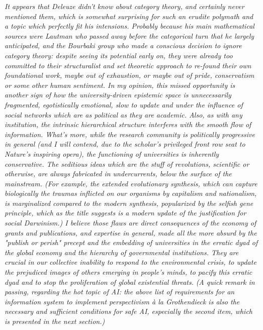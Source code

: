 \documentclass[11pt]{article}
\begin{document}
\emph{It appears that Deleuze didn't know about category theory, and certainly never
mentioned them, which is somewhat surprising for such an erudite polymath and a topic
which perfectly fit his intensions. Probably because his main mathematical sources were
Lautman who passed away before the categorical turn that he largely anticipated, and the
Bourbaki group who made a conscious decision to ignore category theory: despite seeing
its potential early on, they were already too committed to their structuralist and set
theoretic approach to re-found their own foundational work, maybe out of exhaustion, or
maybe out of pride, conservatism or some other human sentiment. In my opinion, this
missed opportunity is another sign of how the university-driven epistemic space is
unnecessarily fragmented, egotistically emotional, slow to update and under the
influence of social networks which are as political as they are academic. Also, as with
any institution, the intrinsic hierarchical structure interferes with the smooth flow of
information. What's more, while the research community is politically progressive in
general (and I will contend, due to the scholar's privileged front row seat to Nature's
inspiring opera), the functioning of universities is inherently conservative. The
seditious ideas which are the stuff of revolutions, scientific or otherwise, are always
fabricated in undercurrents, below the surface of the mainstream. (For example, the
extended evolutionary synthesis, which can capture biologically the traumas inflicted on
our organisms by capitalism and nationalism, is marginalized compared to the modern
synthesis, popularized by the selfish gene principle, which as the title suggests is a
modern update of the justification for social Darwinism.) I believe those flaws are
direct consequences of the economy of grants and publications, and expertise in general,
made all the more absurd by the "publish or perish" precept and the embedding of
universities in the erratic dyad of the global economy and the hierarchy of governmental
institutions. They are crucial in our collective inability to respond to the
environmental crisis, to update the prejudiced images of others emerging in people's
minds, to pacify this erratic dyad and to stop the proliferation of global existential
threats.} \emph{(A quick remark in passing, regarding the hot topic of AI: the above
list of requirements for an information system to implement perspectivism à la
Grothendieck is also the necessary and sufficient conditions for safe AI, especially the
second item, which is presented in the next section.)}
\end{document}
